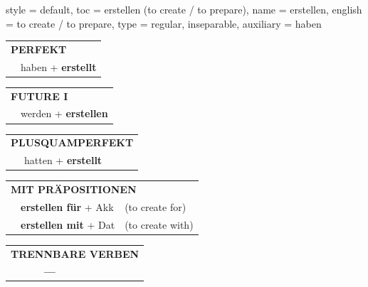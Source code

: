 \begin{verbentry}{
  style = {default},
  toc = {erstellen (to create / to prepare)},
  name = {erstellen},
  english = {to create / to prepare},
  type = {regular, inseparable},
  auxiliary = {haben}
}
 \begin{tabular}{rl}
     \multicolumn{2}{l}{\textbf{PERFEKT}}\\
   & haben + \textbf{erstellt}\\
  \end{tabular}
\hfill
   \begin{tabular}{rl}
    \multicolumn{2}{l}{\textbf{FUTURE I} }\\
   & werden + \textbf{erstellen}\\
  \end{tabular}
\hfill
   \begin{tabular}{rl}
      \multicolumn{2}{l}{\textbf{PLUSQUAMPERFEKT}}\\
   & hatten + \textbf{erstellt}\\
  \end{tabular}

   \vspace{10pt}

   \begin{tabular}{lll}
      \multicolumn{3}{l}{\textbf{MIT PRÄPOSITIONEN}}\\
& \textbf{erstellen für} + Akk & (to create for)\\
& \textbf{erstellen mit} + Dat & (to create with)\\
\end{tabular}
  \hfill
   \begin{tabular}{lll}
\multicolumn{3}{l}{\textbf{TRENNBARE VERBEN}}\\
& \textbf{---} & \\
\end{tabular}

  \vspace{-5pt}
\end{verbentry}

